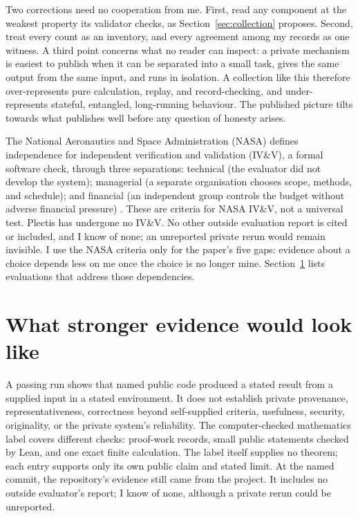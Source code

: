 \documentclass[11pt]{article}
\begin{document}
Two corrections need no cooperation from me. First, read any component at the
weakest property its validator checks, as Section~\ref{sec:collection}
proposes. Second, treat every count as an inventory, and every agreement among
my records as one witness. A third point concerns what no reader can inspect:
a private mechanism is easiest to publish when it can be separated into a
small task, gives the same output from the same input, and runs in isolation.
A collection like this
therefore over-represents pure calculation, replay, and record-checking, and
under-represents stateful, entangled, long-running behaviour. The
published picture tilts towards what publishes well before any question of
honesty arises.

The National Aeronautics and Space Administration (NASA) defines independence
for independent verification and validation (IV\&V), a formal software check,
through three separations: technical (the evaluator did not develop the system);
managerial (a separate organisation chooses scope, methods, and schedule); and
financial (an independent group controls the budget without adverse financial
pressure) \cite[\S4.4.1.2, p.~48]{nasa8739}.
These are criteria for NASA IV\&V, not a universal test. Plectis has undergone
no IV\&V. No other outside evaluation report is cited or included, and I know
of none; an unreported private rerun would remain invisible. I use the NASA
criteria only for the paper's five gaps: evidence about a choice depends less
on me once the choice is no longer mine. Section~\ref{sec:stronger} lists
evaluations that address those dependencies.

\section{What stronger evidence would look like}
\label{sec:stronger}

A passing run shows that named public code produced a stated result from a
supplied input in a stated environment. It does not establish private
provenance, representativeness, correctness beyond self-supplied criteria,
usefulness, security, originality, or the private system's reliability. The
computer-checked mathematics label covers different checks: proof-work records,
small public statements checked by Lean, and one exact finite calculation. The
label itself supplies no theorem; each entry supports only its own public claim
and stated limit. At the named commit, the repository's evidence still came
from the project. It includes no outside evaluator's report; I know of none,
although a private rerun could be unreported.
\end{document}
